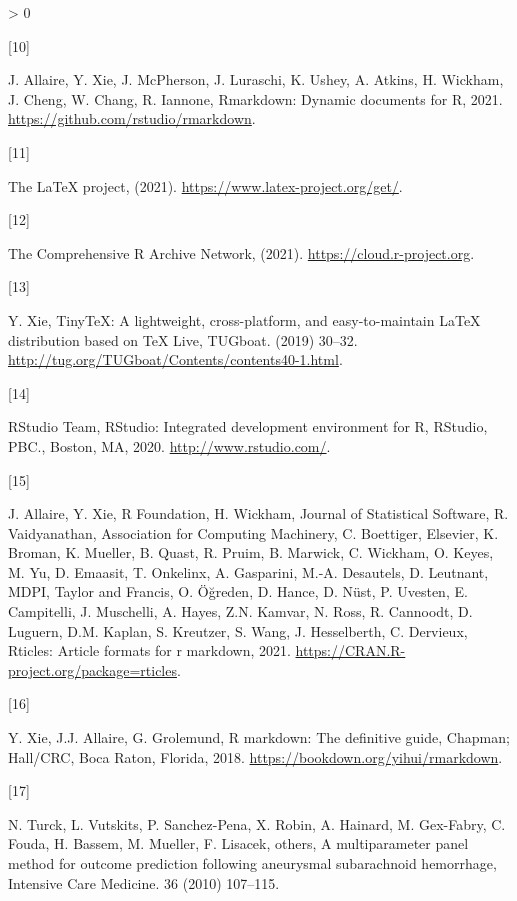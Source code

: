 \documentclass[]{elsarticle} %
\newlength{\csllabelwidth}
\newlength{\cslhangindent}
\newenvironment{CSLReferences}[3] %
 {%
  \setlength{\parindent}{0pt}
  \ifodd #1 \everypar{\setlength{\hangindent}{\cslhangindent}}\ignorespaces\fi
  \ifnum #2 > 0
  \setlength{\parskip}{#2\baselineskip}
  \fi
 }%
 {}
\newcommand{\CSLLeftMargin}[1]{\parbox[t]{\csllabelwidth}{#1}}
\newcommand{\CSLRightInline}[1]{\parbox[t]{\linewidth - \csllabelwidth}{#1}}
\begin{document}
\begin{CSLReferences}{0}{0}
\leavevmode\hypertarget{ref-allaire2021}{}%
\CSLLeftMargin{{[}10{]} }
\CSLRightInline{J. Allaire, Y. Xie, J. McPherson, J. Luraschi, K. Ushey,
A. Atkins, H. Wickham, J. Cheng, W. Chang, R. Iannone, Rmarkdown:
Dynamic documents for {R}, 2021.
\url{https://github.com/rstudio/rmarkdown}.}

\leavevmode\hypertarget{ref-latex_link}{}%
\CSLLeftMargin{{[}11{]} }
\CSLRightInline{{The LaTeX project}, (2021).
\url{https://www.latex-project.org/get/}.}

\leavevmode\hypertarget{ref-Rdownload}{}%
\CSLLeftMargin{{[}12{]} }
\CSLRightInline{{The Comprehensive R Archive Network}, (2021).
\url{https://cloud.r-project.org}.}

\leavevmode\hypertarget{ref-xie2019}{}%
\CSLLeftMargin{{[}13{]} }
\CSLRightInline{Y. Xie, TinyTeX: A lightweight, cross-platform, and
easy-to-maintain LaTeX distribution based on {TeX Live}, TUGboat. (2019)
30--32. \url{http://tug.org/TUGboat/Contents/contents40-1.html}.}

\leavevmode\hypertarget{ref-Rstudio}{}%
\CSLLeftMargin{{[}14{]} }
\CSLRightInline{RStudio Team, RStudio: Integrated development
environment for {R}, RStudio, PBC., Boston, MA, 2020.
\url{http://www.rstudio.com/}.}

\leavevmode\hypertarget{ref-rticles}{}%
\CSLLeftMargin{{[}15{]} }
\CSLRightInline{J. Allaire, Y. Xie, R Foundation, H. Wickham, Journal of
Statistical Software, R. Vaidyanathan, Association for Computing
Machinery, C. Boettiger, Elsevier, K. Broman, K. Mueller, B. Quast, R.
Pruim, B. Marwick, C. Wickham, O. Keyes, M. Yu, D. Emaasit, T. Onkelinx,
A. Gasparini, M.-A. Desautels, D. Leutnant, MDPI, Taylor and Francis, O.
Öğreden, D. Hance, D. Nüst, P. Uvesten, E. Campitelli, J. Muschelli, A.
Hayes, Z.N. Kamvar, N. Ross, R. Cannoodt, D. Luguern, D.M. Kaplan, S.
Kreutzer, S. Wang, J. Hesselberth, C. Dervieux, Rticles: Article formats
for r markdown, 2021. \url{https://CRAN.R-project.org/package=rticles}.}

\leavevmode\hypertarget{ref-rmarkdowndefinitive}{}%
\CSLLeftMargin{{[}16{]} }
\CSLRightInline{Y. Xie, J.J. Allaire, G. Grolemund, R markdown: The
definitive guide, Chapman; Hall/CRC, Boca Raton, Florida, 2018.
\url{https://bookdown.org/yihui/rmarkdown}.}

\leavevmode\hypertarget{ref-turck2010multiparameter}{}%
\CSLLeftMargin{{[}17{]} }
\CSLRightInline{N. Turck, L. Vutskits, P. Sanchez-Pena, X. Robin, A.
Hainard, M. Gex-Fabry, C. Fouda, H. Bassem, M. Mueller, F. Lisacek,
others, A multiparameter panel method for outcome prediction following
aneurysmal subarachnoid hemorrhage, Intensive Care Medicine. 36 (2010)
107--115.}


\end{CSLReferences}
\end{document}
